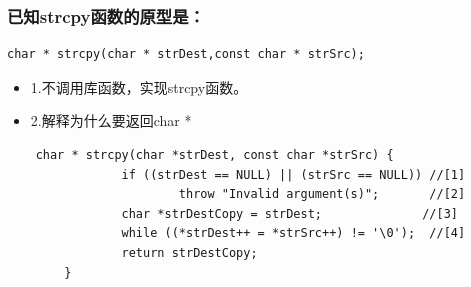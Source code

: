 \documentclass[9pt, b5paper]{article}
\begin{document}
\subsubsection{已知strcpy函数的原型是：}
\label{sec:orge999f34}
\begin{verbatim}
char * strcpy(char * strDest,const char * strSrc);
\end{verbatim}
\begin{itemize}
\item 1.不调用库函数，实现strcpy函数。
\item 2.解释为什么要返回char *
\end{itemize}
\begin{verbatim}
    char * strcpy(char *strDest, const char *strSrc) {        
                if ((strDest == NULL) || (strSrc == NULL)) //[1]
                        throw "Invalid argument(s)";       //[2]
                char *strDestCopy = strDest;              //[3]
                while ((*strDest++ = *strSrc++) != '\0');  //[4]
                return strDestCopy;
        }
\end{verbatim}
\end{document}

